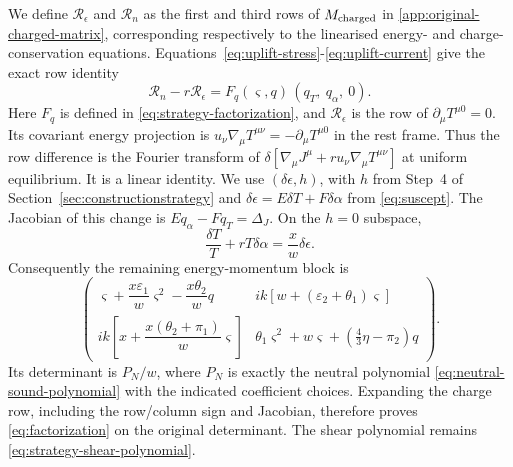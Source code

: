 We define $\mathcal R_\epsilon$ and $\mathcal R_n$ as the first and third rows of $M_{\rm charged}$ in \eqref{app:original-charged-matrix}, corresponding respectively to the linearised energy- and charge-conservation equations. Equations~\eqref{eq:uplift-stress}-\eqref{eq:uplift-current}
give the exact row identity
\begin{equation}\label{app:eq:charged-uplift-row}
 \mathcal R_n-r\mathcal R_\epsilon
 =F_q(\varsigma,q)\,(q_T,\ q_\alpha,\ 0).
\end{equation}
Here $F_q$ is defined in \eqref{eq:strategy-factorization}, and $\mathcal R_\epsilon$ is the row of $\partial_\mu T^{\mu 0}=0$.
Its covariant energy projection is
$u_\nu\nabla_\mu T^{\mu\nu}=-\partial_\mu T^{\mu0}$ in the rest frame.
Thus the row difference is the Fourier transform of
$\delta[\nabla_\mu J^\mu+r u_\nu\nabla_\mu T^{\mu\nu}]$ at uniform
equilibrium. It is a linear identity. 
We use $(\delta\epsilon,h)$, with $h$ from Step~4 of
Section~\ref{sec:constructionstrategy} and
$\delta\epsilon=E\delta T+F\delta\alpha$ from \eqref{eq:suscept}.
The Jacobian of this change is $E q_\alpha-Fq_T={\Delta_J}$.
On the $h=0$ subspace,
\begin{equation}
 \frac{\delta T}{T}+rT\delta\alpha=\frac{x}{w}\delta\epsilon.
\end{equation}
Consequently the remaining energy-momentum block is
\begin{equation}
 \begin{pmatrix}
 \varsigma+\dfrac{x \varepsilon_1}{w}\varsigma^2-\dfrac{x \theta_2}{w}q
 &ik[w+(\varepsilon_2+\theta_1)\varsigma]\\[3pt]
 ik\left[x+\dfrac{x(\theta_2+\pi_1)}w \varsigma\right]
 &\theta_1\varsigma^2+w\varsigma+(\frac43\eta-\pi_2)q
 \end{pmatrix}.
\end{equation}
Its determinant is $P_N/w$, where $P_N$ is exactly the neutral polynomial
\eqref{eq:neutral-sound-polynomial} with the indicated coefficient choices.
Expanding the charge row, including the row/column sign and Jacobian,
therefore proves \eqref{eq:factorization} on the original determinant.
The shear polynomial remains \eqref{eq:strategy-shear-polynomial}.


